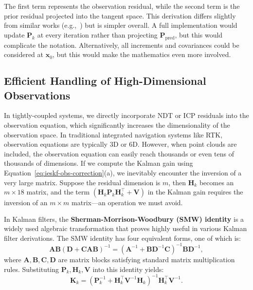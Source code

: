 The first term represents the observation residual, while the second term is the prior residual projected into the tangent space. This derivation differs slightly from similar works (e.g.,~\cite{he2021kalman,Barfoot2016}) but is simpler overall. A full implementation would update \(\mathbf{P}_k\) at every iteration rather than projecting \(\mathbf{P}_{\mathrm{pred}}\), but this would complicate the notation. Alternatively, all increments and covariances could be considered at \(\mathbf{x}_0\), but this would make the mathematics even more involved.

\subsection{Efficient Handling of High-Dimensional Observations}  

In tightly-coupled systems, we directly incorporate NDT or ICP residuals into the observation equation, which significantly increases the dimensionality of the observation space. In traditional integrated navigation systems like RTK, observation equations are typically 3D or 6D. However, when point clouds are included, the observation equation can easily reach thousands or even tens of thousands of dimensions. If we compute the Kalman gain using Equation~\eqref{eq:ieskf-obs-correction}(a), we inevitably encounter the inversion of a very large matrix. Suppose the residual dimension is \( m \), then \(\mathbf{H}_k\) becomes an \( m \times 18 \) matrix, and the term \((\mathbf{H}_k \mathbf{P}_{k} \mathbf{H}_k^\top + \mathbf{V})\) in the Kalman gain requires the inversion of an \( m \times m \) matrix—an operation we must avoid.  

In Kalman filters, the \textbf{Sherman-Morrison-Woodbury (SMW) identity} \cite{Sherman1950,Barfoot2016} is a widely used algebraic transformation that proves highly useful in various Kalman filter derivations. The SMW identity has four equivalent forms, one of which is:  
\begin{equation}\label{key}  
	\mathbf{A} \mathbf{B} (\mathbf{D} + \mathbf{C} \mathbf{A} \mathbf{B})^{-1} = (\mathbf{A}^{-1} + \mathbf{B} \mathbf{D}^{-1} \mathbf{C})^{-1} \mathbf{B} \mathbf{D}^{-1},  
\end{equation}  
where \(\mathbf{A}, \mathbf{B}, \mathbf{C}, \mathbf{D}\) are matrix blocks satisfying standard matrix multiplication rules. Substituting \(\mathbf{P}_k, \mathbf{H}_k, \mathbf{V}\) into this identity yields:  
\begin{equation}\label{eq:8.11}  
	\mathbf{K}_k  = (\mathbf{P}_k^{-1} + \mathbf{H}_k^\top \mathbf{V}^{-1} \mathbf{H}_k)^{-1} \mathbf{H}_k^\top \mathbf{V}^{-1}.  
\end{equation}  


